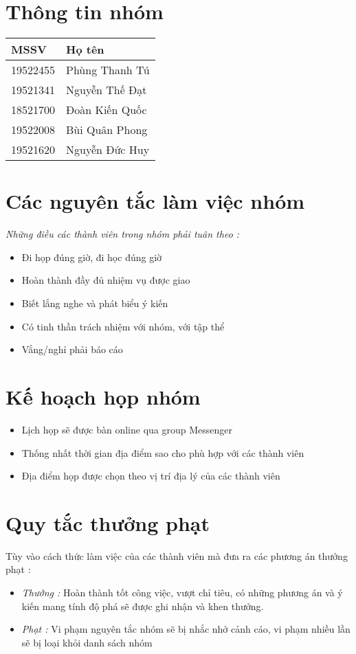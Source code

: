 \documentclass[12pt]{article}
\begin{document}
 \begin{titlepage}

 \section{Thông tin nhóm}
 \begin{tabular}{|l|l|}
 \hline
 MSSV  & Họ tên  \\  \hline
19522455  & Phùng Thanh Tú  \\  \hline
19521341  & Nguyễn Thế Đạt  \\  \hline
18521700  & Đoàn Kiến Quốc  \\  \hline
19522008  & Bùi Quân Phong               \\ \hline
19521620  & Nguyễn Đức Huy  \\ \hline

 \end{tabular}
 \section{Các nguyên tắc làm việc nhóm}
 \textit{ Những điều các thành viên trong nhóm phải tuân theo :}
 \begin{itemize}
     \item Đi họp đúng giờ, đi học đúng giờ
     \item Hoàn thành đầy đủ nhiệm vụ được giao
     \item Biết lắng nghe và phát biểu ý kiến
     \item Có tinh thần trách nhiệm với nhóm, với tập thể
     \item Vắng/nghỉ phải báo cáo
     
 \end{itemize}
 \section{Kế hoạch họp nhóm}
\begin{itemize}
    \item Lịch họp sẽ được bàn online qua group Messenger
    \item Thống nhất thời gian địa điểm sao cho phù hợp với các thành viên
    \item Địa điểm họp được chọn theo vị trí địa lý của các thành viên
\end{itemize}
\section{Quy tắc thưởng phạt}
Tùy vào cách thức làm việc của các thành viên mà đưa ra các phương án thưởng phạt :
\begin{itemize}
    \item \textit{Thưởng :} Hoàn thành tốt công việc, vượt chỉ tiêu, có những phương án và ý kiến mang tính độ phá sẽ được ghi nhận và khen thưởng.
    \item \textit{Phạt :} Vi phạm nguyên tắc nhóm sẽ bị nhắc nhở cảnh cáo, vi phạm nhiều lần sẽ bị loại khỏi danh sách nhóm
\end{itemize}

\end{titlepage}
\end{document}
